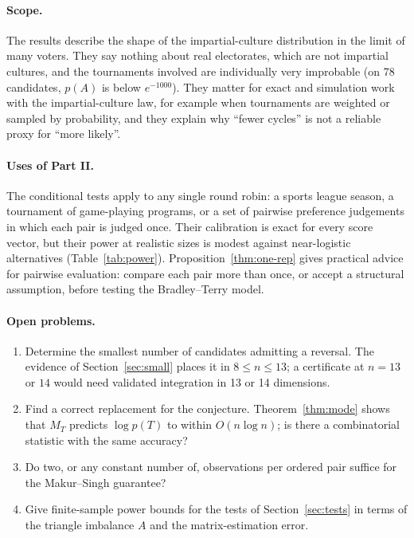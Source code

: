 \documentclass[11pt,a4paper]{article}
\theoremstyle{definition}
\begin{document}
\paragraph{Scope.} The results describe the shape of the impartial-culture distribution in the limit of many voters. They say nothing about real electorates, which are not impartial cultures, and the tournaments involved are individually very improbable (on 78 candidates, $p(A)$ is below $e^{-1000}$). They matter for exact and simulation work with the impartial-culture law, for example when tournaments are weighted or sampled by probability, and they explain why ``fewer cycles'' is not a reliable proxy for ``more likely''.

\paragraph{Uses of Part II.} The conditional tests apply to any single round robin: a sports league season, a tournament of game-playing programs, or a set of pairwise preference judgements in which each pair is judged once. Their calibration is exact for every score vector, but their power at realistic sizes is modest against near-logistic alternatives (Table~\ref{tab:power}). Proposition~\ref{thm:one-rep} gives practical advice for pairwise evaluation: compare each pair more than once, or accept a structural assumption, before testing the Bradley--Terry model.

\paragraph{Open problems.}
\begin{enumerate}[leftmargin=*]
\item Determine the smallest number of candidates admitting a reversal. The evidence of Section~\ref{sec:small} places it in $8\le n\le13$; a certificate at $n=13$ or $14$ would need validated integration in 13 or 14 dimensions.
\item Find a correct replacement for the conjecture. Theorem~\ref{thm:mode} shows that $M_T$ predicts $\log p(T)$ to within $O(n\log n)$; is there a combinatorial statistic with the same accuracy?
\item Do two, or any constant number of, observations per ordered pair suffice for the Makur--Singh guarantee?
\item Give finite-sample power bounds for the tests of Section~\ref{sec:tests} in terms of the triangle imbalance $A$ and the matrix-estimation error.
\end{enumerate}
\end{document}
